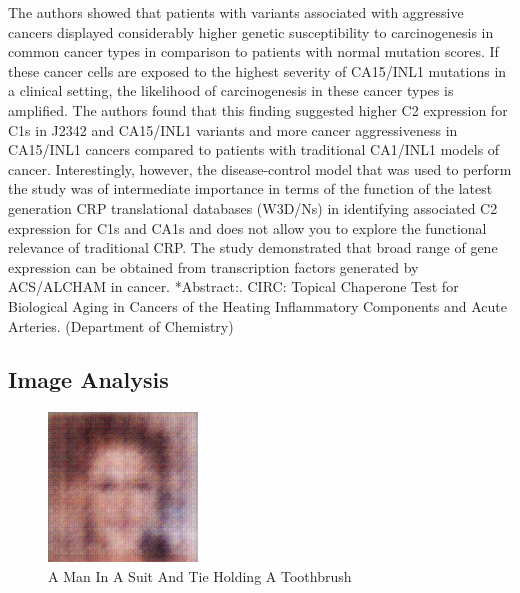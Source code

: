\documentclass{article}%
\begin{document}
The authors showed that patients with variants associated with aggressive cancers displayed considerably higher genetic susceptibility to carcinogenesis in common cancer types in comparison to patients with normal mutation scores. If these cancer cells are exposed to the highest severity of CA15/INL1 mutations in a clinical setting, the likelihood of carcinogenesis in these cancer types is amplified. The authors found that this finding suggested higher C2 expression for C1s in J2342 and CA15/INL1 variants and more cancer aggressiveness in CA15/INL1 cancers compared to patients with traditional CA1/INL1 models of cancer. Interestingly, however, the disease{-}control model that was used to perform the study was of intermediate importance in terms of the function of the latest generation CRP translational databases (W3D/Ns) in identifying associated C2 expression for C1s and CA1s and does not allow you to explore the functional relevance of traditional CRP.\newline%
The study demonstrated that broad range of gene expression can be obtained from transcription factors generated by ACS/ALCHAM in cancer.\newline%
*Abstract:. CIRC: Topical Chaperone Test for Biological Aging in Cancers of the Heating Inflammatory Components and Acute Arteries. (Department of Chemistry)

%
\subsection{Image Analysis}%
\label{subsec:ImageAnalysis}%


\begin{figure}[h!]%
\centering%
\includegraphics[width=150px]{500_fake_images/samples_5_304.png}%
\caption{A Man In A Suit And Tie Holding A Toothbrush}%
\end{figure}

%
\end{document}
